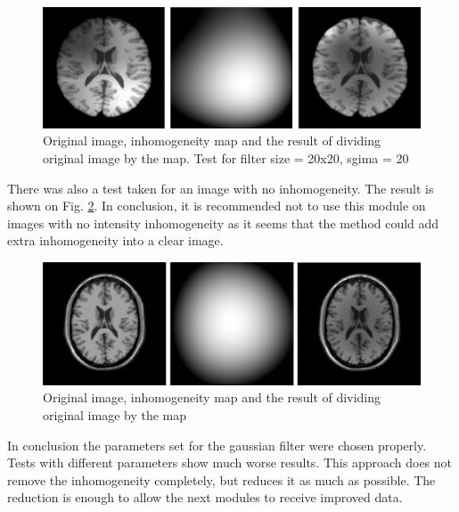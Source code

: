 \begin{figure}[H]
\centering{}\includegraphics[scale=0.5]{figures/Module_02/test4}\caption{Original image, inhomogeneity map and the result of dividing original image by the map. Test for filter size = 20x20, sgima = 20} 
\label{fig: test2_4}
\end{figure}
There was also a test taken for an image with no inhomogeneity. The result is shown on Fig. \ref{fig: test2_5}. In conclusion, it is recommended not to use this module on images with no intensity inhomogeneity as it seems that the method could add extra inhomogeneity into a clear image.
\begin{figure}[H]
\centering{}\includegraphics[scale=0.5]{figures/Module_02/test6}\caption{Original image, inhomogeneity map and the result of dividing original image by the map} 
\label{fig: test2_5}
\end{figure}
In conclusion the parameters set for the gaussian filter were chosen properly. Tests with different parameters show much worse results. This approach does not remove the inhomogeneity completely, but reduces it as much as possible. The reduction is enough to allow the next modules to receive improved data.